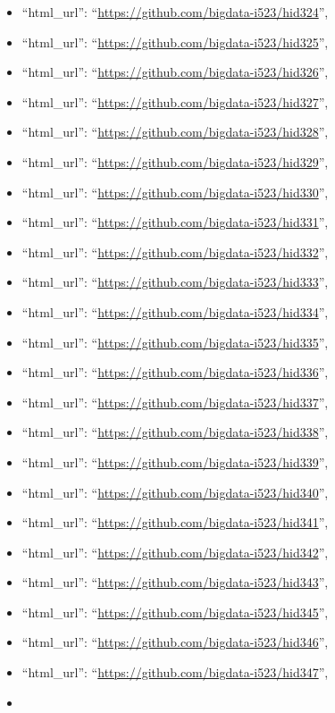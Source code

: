 \begin{itemize}
\item
  ``html\_url'': ``\url{https://github.com/bigdata-i523/hid324}'',
\item
  ``html\_url'': ``\url{https://github.com/bigdata-i523/hid325}'',
\item
  ``html\_url'': ``\url{https://github.com/bigdata-i523/hid326}'',
\item
  ``html\_url'': ``\url{https://github.com/bigdata-i523/hid327}'',
\item
  ``html\_url'': ``\url{https://github.com/bigdata-i523/hid328}'',
\item
  ``html\_url'': ``\url{https://github.com/bigdata-i523/hid329}'',
\item
  ``html\_url'': ``\url{https://github.com/bigdata-i523/hid330}'',
\item
  ``html\_url'': ``\url{https://github.com/bigdata-i523/hid331}'',
\item
  ``html\_url'': ``\url{https://github.com/bigdata-i523/hid332}'',
\item
  ``html\_url'': ``\url{https://github.com/bigdata-i523/hid333}'',
\item
  ``html\_url'': ``\url{https://github.com/bigdata-i523/hid334}'',
\item
  ``html\_url'': ``\url{https://github.com/bigdata-i523/hid335}'',
\item
  ``html\_url'': ``\url{https://github.com/bigdata-i523/hid336}'',
\item
  ``html\_url'': ``\url{https://github.com/bigdata-i523/hid337}'',
\item
  ``html\_url'': ``\url{https://github.com/bigdata-i523/hid338}'',
\item
  ``html\_url'': ``\url{https://github.com/bigdata-i523/hid339}'',
\item
  ``html\_url'': ``\url{https://github.com/bigdata-i523/hid340}'',
\item
  ``html\_url'': ``\url{https://github.com/bigdata-i523/hid341}'',
\item
  ``html\_url'': ``\url{https://github.com/bigdata-i523/hid342}'',
\item
  ``html\_url'': ``\url{https://github.com/bigdata-i523/hid343}'',
\item
  ``html\_url'': ``\url{https://github.com/bigdata-i523/hid345}'',
\item
  ``html\_url'': ``\url{https://github.com/bigdata-i523/hid346}'',
\item
  ``html\_url'': ``\url{https://github.com/bigdata-i523/hid347}'',
\item

\end{itemize}
